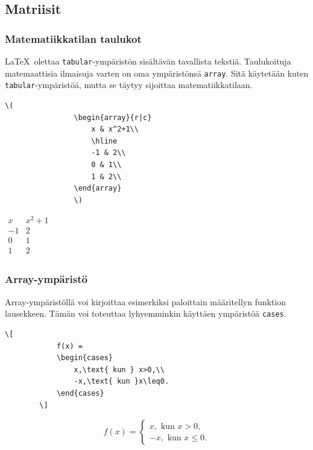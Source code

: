 \documentclass[handout,hyperref={colorlinks=true}]{beamer}
\theoremstyle{remark}
\newcommand{\vaihto}{\\ \vspace{10pt}}
\begin{document}
\subsection{Matriisit}
\begin{frame}[fragile]
    \frametitle{Matematiikkatilan taulukot}
    \LaTeX\ olettaa \verb-tabular--ympäristön sisältävän tavallista tekstiä. Taulukoituja matemaattisia ilmaisuja varten on oma ympäristönsä \verb-array-. Sitä käytetään kuten \verb-tabular--ympäristöä, mutta se täytyy sijoittaa matematiikkatilaan.\vaihto

    \begin{minipage}{5cm}
        \begin{scriptsize}
            \begin{Verbatim}[frame=single]
                \(
                \begin{array}{r|c}
                    x & x^2+1\\
                    \hline
                    -1 & 2\\
                    0 & 1\\
                    1 & 2\\
                \end{array}
                \)
            \end{Verbatim}
        \end{scriptsize}
    \end{minipage}
    \begin{minipage}{3cm}
        \(
        \begin{array}{r|c}
            x & x^2+1\\
            \hline
            -1 & 2\\
            0 & 1\\
            1 & 2\\
        \end{array}
        \)
    \end{minipage}
\end{frame}
\begin{frame}[fragile]
    \frametitle{Array-ympäristö}
    Array-ympäristöllä voi kirjoittaa esimerkiksi paloittain määritellyn funktion lausekkeen. Tämän voi toteuttaa lyhyemminkin käyttäen ympäristöä \verb-cases-. 
    \begin{Verbatim}[frame=single]
        \[
            f(x) =
            \begin{cases}
                x,\text{ kun } x>0,\\
                -x,\text{ kun }x\leq0.
            \end{cases}
        \]
    \end{Verbatim}
    \begin{framed}
        \[
            f(x) =
            \begin{cases}
                x,\text{ kun } x>0,\\
                -x,\text{ kun }x\leq0.
            \end{cases}
        \]
    \end{framed}
\end{frame}
\end{document}

